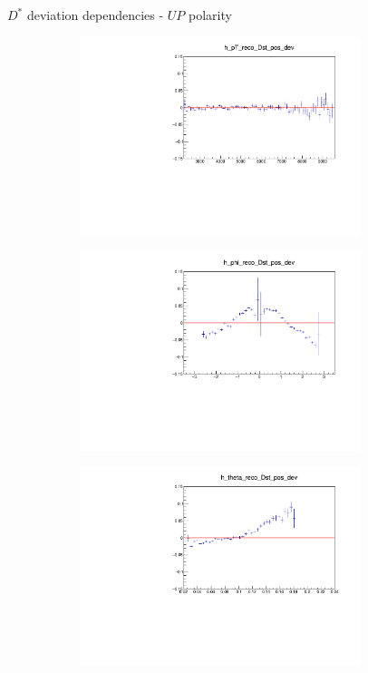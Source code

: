 \documentclass[11pt]{beamer}
\begin{document}
\begin{frame}{$D^*$ deviation dependencies - $UP$ polarity}
\begin{figure}
\begin{subfigure}{0.45\textwidth}
\includegraphics[width=0.9\textwidth]{up_pdf/deviation/h_pt_reco_Dst_pos_dev.pdf}
\end{subfigure}
\begin{subfigure}{0.45\textwidth}
\includegraphics[width=0.9\textwidth]{up_pdf/deviation/h_phi_reco_Dst_pos_dev.pdf}
\end{subfigure}
\begin{subfigure}{0.45\textwidth}
\includegraphics[width=0.9\textwidth]{up_pdf/deviation/h_theta_reco_Dst_pos_dev.pdf}

\end{subfigure}
\end{figure}
\end{frame}
\end{document}
